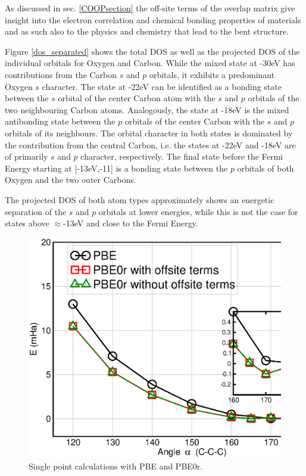 \documentclass[%
 reprint,
nofootinbib,
 amsmath,amssymb,
 aps,
]{revtex4-2}
\begin{document}
As discussed in sec. \ref{COOPsection} the off-site terms of the overlap matrix give insight into the electron correlation and chemical bonding properties of materials and as such also to the physics and chemistry that lead to the bent structure.

Figure \ref{dos_separated} shows the total DOS as well as the projected DOS of the individual orbitals for Oxygen and Carbon.
While the mixed state at -30eV has contributions from the Carbon $s$ and $p$ orbitals, it exhibits a predominant Oxygen $s$ character. 
The state at -22eV can be identified as a bonding state between the $s$ orbital of the center Carbon atom with the $s$ and $p$ orbitals of the two neighbouring Carbon atoms. Analogously, the state at -18eV is the mixed antibonding state between the $p$ orbitals of the center Carbon with the $s$ and $p$ orbitals of its neighbours. The orbital character in both states is dominated by the contribution from the central Carbon, i.e. the states at -22eV and -18eV are of primarily $s$ and $p$ character, respectively. The final state before the Fermi Energy starting at [-13eV,-11] is a bonding state between the $p$ orbitals of both Oxygen and the two outer Carbons. 

The projected DOS of both atom types approximately shows an energetic separation of the $s$ and $p$ orbitals at lower energies, while this is not the case for states above $\approx$-13eV and close to the Fermi Energy.
\begin{figure}
    \centering
     \includegraphics[scale=0.36]{bent_wings.eps}
    \caption{Single point calculations with PBE and PBE0r.\label{single_point_calculations}}
    \label{shorter_oc_bond}
\end{figure}
\end{document}
